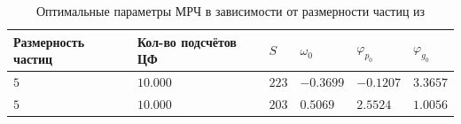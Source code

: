 	\begin{table} [htbp]%
    \centering
    \caption{Оптимальные параметры МРЧ в зависимости от размерности частиц из \cite{Simon2013EvolutionaryOA}}
    \label{tab:tab-pso-opt-params}		\begin{SingleSpace}
        \begin{tabular}{|l|l|l|l|l|l|}
            \hline
            Размерность частиц&Кол-во подсчётов ЦФ&$S$&$\omega_0$ &$\varphi_{p_0}$&$\varphi_{g_0}$\\
            \hline
            $5$&$10.000$&$223$&$-0.3699$&$-0.1207$&$3.3657$\\
            \hline
            $5$&$10.000$&$203$&$0.5069$&$2.5524$&$1.0056$\\
            \hline
        \end{tabular}	
    \end{SingleSpace}
\end{table}
    